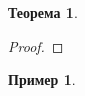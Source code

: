 \documentclass[12pt]{report}
\newtheorem{theorem}{Теорема}
\newtheorem{example}{Пример}
\begin{document}
\begin{theorem}
\end{theorem}

\begin{proof}
\end{proof}

\begin{example}
\end{example}
\end{document}
